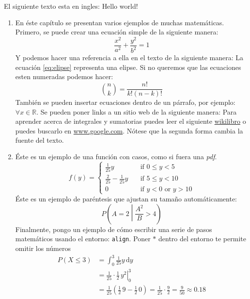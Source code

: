 El siguiente texto esta en ingles: \textenglish{Hello world!}
\begin{enumerate}
 \item 
En éste capítulo se presentan varios ejemplos de muchas matemáticas.
Primero, se puede crear una ecuación simple de la siguiente manera:
 \begin{equation}
 \label{eq:elipse}
 \frac{x^{2}}{a^{2}} + \frac{y^{2}}{b^{2}} = 1
 \end{equation}
Y podemos hacer una referencia a ella en el texto de la siguiente manera: La  ecuación \eqref{eq:elipse} representa una elipse.
Si no queremos que las ecuaciones esten numeradas podemos hacer:
 \begin{equation}
 \nonumber
 \binom{n}{k} = \frac{n!}{k!(n-k)!} 
 \end{equation}
 También se pueden insertar ecuaciones dentro de un párrafo, por ejemplo: $\forall x \in \mathbb{R}$.
Se pueden poner links a un sitio web de la siguiente manera:
Para aprender acerca de integrales y sumatorias puedes leer el siguiente \href{https://en.wikibooks.org/wiki/LaTeX/Mathematics#Sums_and_integrals}{wikilibro} o puedes buscarlo en \url{www.google.com}.
Nótese que la segunda forma cambia la fuente del texto.
 
 \item Éste es un ejemplo de una función con casos, como si fuera una \emph{pdf}.
 \begin{equation}
  \label{eq:pdf}
  f(y) =
  \begin{cases}
    \frac{1}{25} y & \quad \text{if } 0 \leq y < 5 \\
    \frac{2}{25} - \frac{1}{25} y & \quad \text{if } 5 \leq y < 10 \\
    0 & \quad \text{if } y < 0 \text{ or } y > 10
  \end{cases}
 \end{equation}
Éste es un ejemplo de paréntesis que ajustan su tamaño automáticamente:
 \begin{equation}
  \nonumber
  P\left(A=2\middle|\frac{A^2}{B}>4\right)
 \end{equation}
Finalmente, pongo un ejemplo de cómo escribir una serie de pasos matemáticos usando el entorno: \verb|align|.
Poner $*$ dentro del entorno te permite omitir los números
\begin{align*}
P\left(X \leq 3 \right) &= \int_{0}^{3} \frac{1}{25} y \,\mathrm{d}y \\
     &= \left. \frac{1}{25} \cdot \frac{1}{2} \, y^{2} \right|_0^3 \\
     &= \frac{1}{25} \left( \frac{1}{2} \, 9 - \frac{1}{2} \, 0 \right) =
     \frac{1}{25} \cdot \frac{9}{2} = \frac{9}{50} \approx 0.18 
\end{align*}


\end{enumerate}
